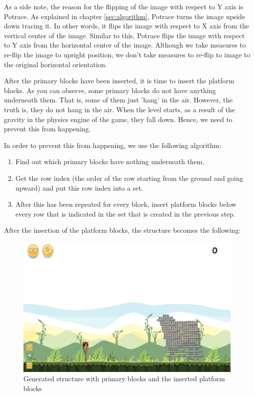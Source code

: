 \documentclass{dalthesis}
\begin{document}
As a side note, the reason for the flipping of the image with respect to Y axis is Potrace. As explained in chapter \ref{sec:algorithm}, Potrace turns the image upside down tracing it. In other words, it flips the image with respect to X axis from the vertical center of the image. Similar to this, Potrace flips the image with respect to Y axis from the horizontal center of the image. Although we take measures to re-flip the image to upright position, we don't take measures to re-flip to image to the original horizontal orientation.

After the primary blocks have been inserted, it is time to insert the platform blocks. As you can observe, some primary blocks do not have anything underneath them. That is, some of them just 'hang' in the air. However, the truth is, they do not hang in the air. When the level starts, as a result of the gravity in the physics engine of the game, they fall down. Hence, we need to prevent this from happening.

In order to prevent this from happening, we use the following algorithm:

\begin{enumerate}
  \item Find out which primary blocks have nothing underneath them.

  \item Get the row index (the order of the row starting from the ground and going upward) and put this row index into a set.

  \item After this has been repeated for every block, insert platform blocks below every row that is indicated in the set that is created in the previous step.
\end{enumerate}

After the insertion of the platform blocks, the structure becomes the following:

\begin{figure}[H]
	\caption{Generated structure with primary blocks and the inserted platform blocks}
  \includegraphics[width=\textwidth,height=\textheight,keepaspectratio]{process/cow-primary_and_platform_blocks.png}
\end{figure}
\end{document}
